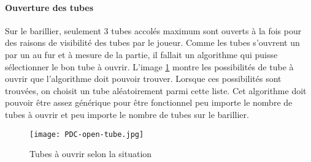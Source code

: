 \paragraph{Ouverture des tubes}Sur le barillier, seulement 3 tubes accolés maximum sont ouverts à la fois pour des raisons de visibilité des tubes par le joueur. Comme les tubes
s'ouvrent un par un au fur et à mesure de la partie, il fallait un algorithme qui puisse sélectionner le bon tube à ouvrir. L'image \ref{OpenTube} montre les possibilités de tube à
ouvrir que l'algorithme doit pouvoir trouver. Lorsque ces possibilités sont trouvées, on choisit un tube aléatoirement parmi cette liste. Cet algorithme doit pouvoir être assez
générique pour être fonctionnel peu importe le nombre de tubes à ouvrir et peu importe le nombre de tubes sur le barillier.

\begin{figure}[H]
    \begin{center}
    \texttt{[image: PDC-open-tube.jpg]}
    \end{center}
    \caption{Tubes à ouvrir selon la situation}
\label{OpenTube}
\end{figure}

